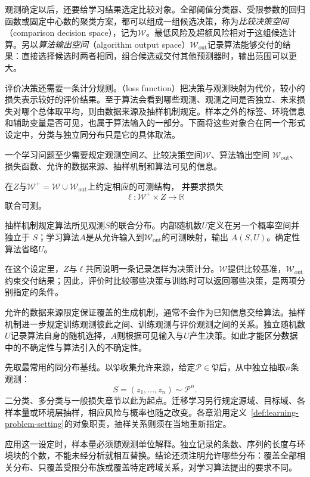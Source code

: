 观测确定以后，还要给学习结果选定比较对象。全部阈值分类器、受限参数的回归函数或固定中心数的聚类方案，都可以组成一组候选决策，称为\emph{比较决策空间}（comparison decision space），记为$\mathcal W$。最低风险及超额风险相对于这组候选计算。另以\emph{算法输出空间}（algorithm output space）$\mathcal W_{\mathrm{out}}$记录算法能够交付的结果：直接选择候选时两者相同，组合候选或交付其他预测器时，输出范围可以更大。

评价决策还需要一条计分规则。（loss function）把决策与观测映射为代价，较小的损失表示较好的评价结果。至于算法会看到哪些观测、观测之间是否独立、未来损失对哪个总体取平均，则由数据来源及抽样机制规定。样本之外的标签、环境信息和辅助变量是否可见，也属于算法输入的一部分。下面将这些对象合在同一个形式设定中，分类与独立同分布只是它的具体取法。

\begin{definition}[学习问题的形式设定]
\label{def:learning-problem-setting}
一个学习问题至少需要规定观测空间$Z$、比较决策空间$\mathcal W$、算法输出空间
$\mathcal W_{\mathrm{out}}$、损失函数、允许的数据来源、抽样机制和算法可见的信息。

在$Z$与$\mathcal W^+=\mathcal W\cup\mathcal W_{\mathrm{out}}$上约定相应的可测结构，
并要求损失
\[
 \ell:\mathcal W^+\times Z\to\mathbb R
\]
联合可测。

抽样机制规定算法所见观测$S$的联合分布。内部随机数$U$定义在另一个概率空间并独立于
$S$；学习算法$A$是从允许输入到$\mathcal W_{\mathrm{out}}$的可测映射，输出
$A(S,U)$。确定性算法省略$U$。
\end{definition}

在这个设定里，$Z$与$\ell$共同说明一条记录怎样为决策计分。$\mathcal W$提供比较基准，$\mathcal W_{\mathrm{out}}$约束交付结果；因此，评价时比较哪些决策与训练时可以返回哪些决策，是两项分别指定的条件。

允许的数据来源限定保证覆盖的生成机制，通常不会作为已知信息交给算法。抽样机制进一步规定训练观测彼此之间、训练观测与评价观测之间的关系。独立随机数$U$记录算法自身的随机选择，$A$则根据可见输入与$U$产生决策。如此才能区分数据中的不确定性与算法引入的不确定性。

先取最常用的同分布基线。以$\mathfrak P$收集允许来源，给定$\mathcal P\in\mathfrak P$后，从中独立抽取$n$条观测：
\[
 S=(z_1,\ldots,z_n)\sim\mathcal P^n.
\]
二分类、多分类与一般损失章节以此为起点。迁移学习另行规定源域、目标域、各样本量或环境层抽样，相应风险与概率也随之改变。各章沿用定义~\ref{def:learning-problem-setting}的对象职责，抽样关系则须在当地重新指定。

应用这一设定时，样本量必须随观测单位解释。独立记录的条数、序列的长度与环境块的个数，不能未经分析就相互替换。结论还须注明允许哪些分布：覆盖全部相关分布、只覆盖受限分布族或覆盖特定跨域关系，对学习算法提出的要求不同。


